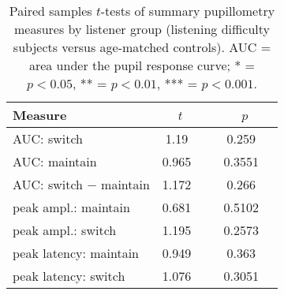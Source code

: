 \begin{center}
\begin{longtable}{l S[table-format=>1.2] c S[table-format=>1.3] c }
\caption{Paired samples $t$-tests of summary pupillometry measures by listener group (listening difficulty subjects versus age-matched controls). AUC = area under the pupil response curve; * = $p<0.05$, ** = $p<0.01$, *** = $p<0.001$.} \label{table-ttests} \\

\toprule
Measure                    &   & ~ &  &     \\ \midrule
AUC: switch                &                    1.19   & ~ &                  0.259   &     \\
AUC: maintain              &                    0.965  & ~ &                  0.3551  &     \\
AUC: switch − maintain     &                    1.172  & ~ &                  0.266   &     \\
peak ampl.: maintain       &                    0.681  & ~ &                  0.5102  &     \\
peak ampl.: switch         &                    1.195  & ~ &                  0.2573  &     \\
peak latency: maintain     &                    0.949  & ~ &                  0.363   &     \\
peak latency: switch       &                    1.076  & ~ &                  0.3051  &     \\

\end{longtable}
\end{center}
